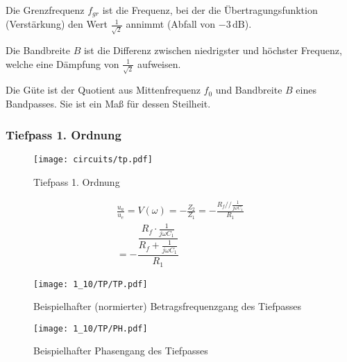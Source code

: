 Die Grenzfrequenz $f_{gr}$ ist die Frequenz, bei der die Übertragungsfunktion
(Verstärkung) den Wert $\frac{1}{\sqrt{2}}$ annimmt (Abfall von
$-3\,\si{\deci\bel}$).

Die Bandbreite $B$ ist die Differenz zwischen niedrigster und
höchster Frequenz, welche eine Dämpfung von $\frac{1}{\sqrt{2}}$ aufweisen.

Die Güte ist der Quotient aus Mittenfrequenz $f_0$ und Bandbreite $B$ eines
Bandpasses. Sie ist ein Maß für dessen Steilheit.

\subsubsection{Tiefpass 1. Ordnung}

\begin{figure}[H]
  \begin{center}
    \texttt{[image: circuits/tp.pdf]}
  \end{center}
  \caption{Tiefpass 1. Ordnung}
\end{figure}

\begin{gather*}
  \frac{u_a}{u_e} = V(\omega) = -\frac{Z_2}{Z_1} = -\frac{R_f // \frac{1}{j \omega
    C_1}}{R_1}\\
= -\dfrac{ \dfrac{R_f \cdot \frac{1}{j\omega C_1}}{R_f + \frac{1}{j \omega C_1}}}{R_1}
\end{gather*}



\begin{figure}[H]
  \begin{center}
    \texttt{[image: 1\_10/TP/TP.pdf]}
  \end{center}
  \caption{Beispielhafter (normierter) Betragsfrequenzgang des Tiefpasses}
\end{figure}

\begin{figure}[H]
  \begin{center}
    \texttt{[image: 1\_10/TP/PH.pdf]}
  \end{center}
  \caption{Beispielhafter Phasengang des Tiefpasses}
\end{figure}

